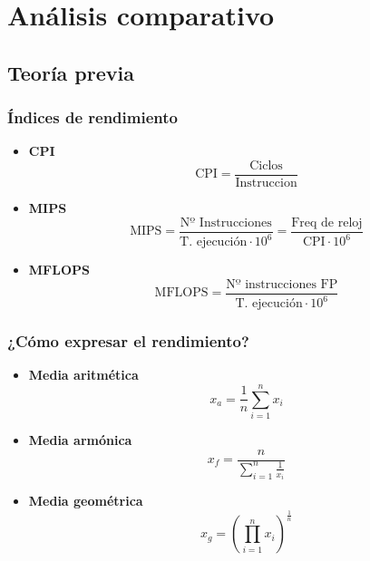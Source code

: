\chapter{Análisis comparativo}

\section{Teoría previa}
\subsection{Índices de rendimiento}
\begin{itemize}
    \item \textbf{CPI}
    \[
    \text{CPI}=\dfrac{\text{Ciclos}}{\text{Instruccion}}
    \]
    \item \textbf{MIPS}
    \[
    \text{MIPS}=
    \dfrac{\text{Nº Instrucciones}}{\text{T. ejecución} \cdot 10^6}=
    \dfrac{\text{Freq de reloj}}{\text{CPI} \cdot 10^6}
    \]
    \item \textbf{MFLOPS}
    \[
    \text{MFLOPS}=
    \dfrac{\text{Nº instrucciones FP}}{\text{T. ejecución} \cdot 10^6}
    \]
\end{itemize}
\subsection{¿Cómo expresar el rendimiento?}
\begin{itemize}
    \item \textbf{Media aritmética}
    \[
    x_a = \dfrac{1}{n}\sum_{i=1}^n x_i
    \]
    \item \textbf{Media armónica}
    \[
    x_f = \dfrac{n}{\sum_{i=1}^n \frac{1}{x_i}}
    \]
    \item \textbf{Media geométrica}
    \[
    x_g = (\prod_{i=1}^n x_i)^\frac{1}{n}
    \]
\end{itemize}
